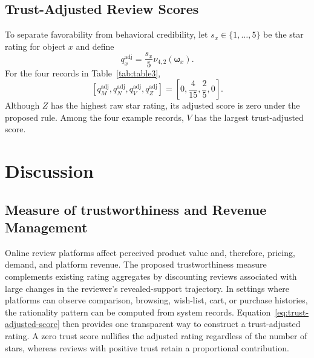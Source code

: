 \documentclass[conference]{IEEEtran}
\theoremstyle{plain}
\theoremstyle{definition}
\theoremstyle{remark}
\begin{document}
	\subsection{Trust-Adjusted Review Scores}
	To separate favorability from behavioral credibility, let $s_x\in\{1,\ldots,5\}$ be the star rating for object $x$ and define
	\begin{equation}\label{eq:trust-adjusted-score}
		q_x^{\mathrm{adj}}=\frac{s_x}{5}\nu_{4,2}(\boldsymbol\omega_x).
	\end{equation}
	For the four records in Table~\ref{tab:table3},
	\begin{equation}
		\left[q_M^{\mathrm{adj}},q_N^{\mathrm{adj}},q_V^{\mathrm{adj}},q_Z^{\mathrm{adj}}\right]
		=\left[0,\frac{4}{15},\frac{2}{5},0\right].
	\end{equation}
	Although $Z$ has the highest raw star rating, its adjusted score is zero under the proposed rule. Among the four example records, $V$ has the largest trust-adjusted score.
	
	\section{Discussion}
	\subsection{Measure of trustworthiness and Revenue Management}
	Online review platforms affect perceived product value and, therefore, pricing, demand, and platform revenue. The proposed trustworthiness measure complements existing rating aggregates by discounting reviews associated with large changes in the reviewer’s revealed-support trajectory. In settings where platforms can observe comparison, browsing, wish-list, cart, or purchase histories, the rationality pattern can be computed from system records. Equation~\eqref{eq:trust-adjusted-score} then provides one transparent way to construct a trust-adjusted rating. A zero trust score nullifies the adjusted rating regardless of the number of stars, whereas reviews with positive trust retain a proportional contribution.
\end{document}
